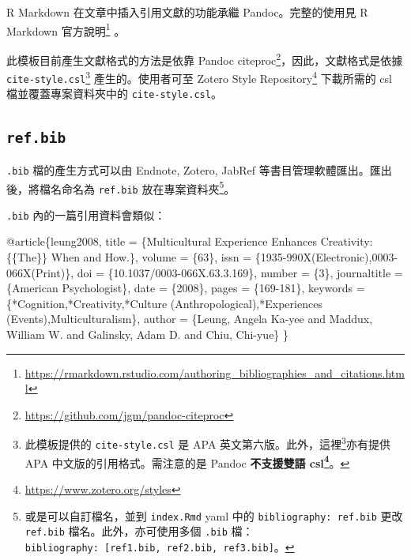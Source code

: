 \documentclass[oneside]{book}
\newenvironment{Shaded}{\begin{snugshade}}{\end{snugshade}}
\newcommand{\DataTypeTok}[1]{\textcolor[rgb]{0.13,0.29,0.53}{#1}}
\newcommand{\OtherTok}[1]{\textcolor[rgb]{0.56,0.35,0.01}{#1}}
\newcommand{\VariableTok}[1]{\textcolor[rgb]{0.00,0.00,0.00}{#1}}
\newcommand{\NormalTok}[1]{#1}
\renewcommand{\href}[2]{#2\footnote{\url{#1}}}
\theoremstyle{definition}
\theoremstyle{definition}
\theoremstyle{definition}
\theoremstyle{remark}
\begin{document}
R Markdown 在文章中插入引用文獻的功能承繼 Pandoc。完整的使用見
\href{https://rmarkdown.rstudio.com/authoring_bibliographies_and_citations.html}{R
Markdown 官方說明} 。

此模板目前產生文獻格式的方法是依靠
\href{https://github.com/jgm/pandoc-citeproc}{Pandoc
citeproc}，因此，文獻格式是依據 \texttt{cite-style.csl}\footnote{此模板提供的
  \texttt{cite-style.csl} 是 APA
  英文第六版。此外，\href{http://blog.pulipuli.info/2011/05/zoteroapa.html}{這裡}亦有提供
  APA 中文版的引用格式。需注意的是 Pandoc
  \textbf{不支援\href{http://blog.pulipuli.info/2014/08/zoteroapa-zotero-citation-style-apa.html}{雙語
  csl}}。} 產生的。使用者可至
\href{https://www.zotero.org/styles}{Zotero Style Repository} 下載所需的
csl 檔並覆蓋專案資料夾中的 \texttt{cite-style.csl}。

\subsection{\texorpdfstring{\texttt{ref.bib}}{ref.bib}}\label{ref-bib}

\texttt{.bib} 檔的產生方式可以由 Endnote, Zotero, JabRef
等書目管理軟體匯出。匯出後，將檔名命名為 \texttt{ref.bib}
放在專案資料夾\footnote{或是可以自訂檔名，並到 \texttt{index.Rmd} yaml
  中的 \texttt{bibliography:\ ref.bib} 更改 \texttt{ref.bib}
  檔名。此外，亦可使用多個 \texttt{.bib}
  檔：\texttt{bibliography:\ {[}ref1.bib,\ ref2.bib,\ ref3.bib{]}}。}。

\texttt{.bib} 內的一篇引用資料會類似：

\begin{Shaded}
\begin{Highlighting}[]
\VariableTok{@article}\NormalTok{\{}\OtherTok{leung2008}\NormalTok{,}
  \DataTypeTok{title}\NormalTok{ = \{Multicultural Experience Enhances Creativity: \{\{The\}\} When and How.\},}
  \DataTypeTok{volume}\NormalTok{ = \{63\},}
  \DataTypeTok{issn}\NormalTok{ = \{1935-990X(Electronic),0003-066X(Print)\},}
  \DataTypeTok{doi}\NormalTok{ = \{10.1037/0003-066X.63.3.169\},}
  \DataTypeTok{number}\NormalTok{ = \{3\},}
  \DataTypeTok{journaltitle}\NormalTok{ = \{American Psychologist\},}
  \DataTypeTok{date}\NormalTok{ = \{2008\},}
  \DataTypeTok{pages}\NormalTok{ = \{169-181\},}
  \DataTypeTok{keywords}\NormalTok{ = \{*Cognition,*Creativity,*Culture (Anthropological),*Experiences (Events),Multiculturalism\},}
  \DataTypeTok{author}\NormalTok{ = \{Leung, Angela Ka-yee and Maddux, William W. and Galinsky, Adam D. and Chiu, Chi-yue\}}
\NormalTok{\}}
\end{Highlighting}
\end{Shaded}
\end{document}
